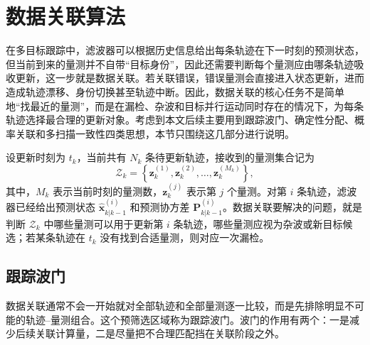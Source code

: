 \documentclass{xdupgthesis}
\begin{document}
\section{数据关联算法}\label{sec:orm}

在多目标跟踪中，滤波器可以根据历史信息给出每条轨迹在下一时刻的预测状态，但当前到来的量测并不自带“目标身份”，因此还需要判断每个量测应由哪条轨迹吸收更新，这一步就是数据关联。若关联错误，错误量测会直接进入状态更新，进而造成轨迹漂移、身份切换甚至轨迹中断。因此，数据关联的核心任务不是简单地“找最近的量测”，而是在漏检、杂波和目标并行运动同时存在的情况下，为每条轨迹选择最合理的更新对象。考虑到本文后续主要用到跟踪波门、确定性分配、概率关联和多扫描一致性四类思想，本节只围绕这几部分进行说明。

设更新时刻为 $t_k$，当前共有 $N_k$ 条待更新轨迹，接收到的量测集合记为
\begin{equation}
	\mathcal{Z}_k=
	\left\{
	\mathbf{z}^{(1)}_k,\mathbf{z}^{(2)}_k,\ldots,\mathbf{z}^{(M_k)}_k
	\right\},
\end{equation}
其中，$M_k$ 表示当前时刻的量测数，$\mathbf{z}^{(j)}_k$ 表示第 $j$ 个量测。对第 $i$ 条轨迹，滤波器已经给出预测状态 $\hat{\mathbf{x}}^{(i)}_{k|k-1}$ 和预测协方差 $\mathbf{P}^{(i)}_{k|k-1}$。数据关联要解决的问题，就是判断 $\mathcal{Z}_k$ 中哪些量测可以用于更新第 $i$ 条轨迹，哪些量测应视为杂波或新目标候选；若某条轨迹在 $t_k$ 没有找到合适量测，则对应一次漏检。

\subsection{跟踪波门}

数据关联通常不会一开始就对全部轨迹和全部量测逐一比较，而是先排除明显不可能的轨迹--量测组合。这个预筛选区域称为跟踪波门。波门的作用有两个：一是减少后续关联计算量，二是尽量把不合理匹配挡在关联阶段之外。
\end{document}
